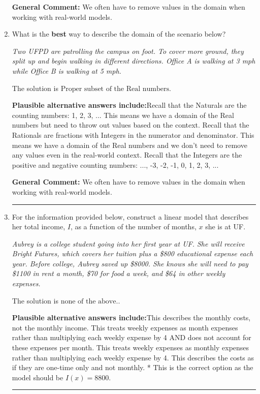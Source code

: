 \documentclass{extbook}[14pt]
\newcommand{\litem}[1]{\item #1

\rule{\textwidth}{0.4pt}}
\begin{document}
\begin{enumerate}
{\textbf{General Comment:} We often have to remove values in the domain when working with real-world models.
}
\litem{
What is the \textbf{best} way to describe the domain of the scenario below?

\begin{center}
    \textit{ Two UFPD are patrolling the campus on foot. To cover more ground, they split up and begin walking in different directions. Office A is walking at 3 mph while Office B is walking at 5 mph. }
\end{center}
The solution is \( \text{Proper subset of the Real numbers} \).\begin{enumerate}[label=\Alph*.]
\textbf{Plausible alternative answers include:}Recall that the Naturals are the counting numbers: 1, 2, 3, ...
This means we have a domain of the Real numbers but need to throw out values based on the context.
Recall that the Rationals are fractions with Integers in the numerator and denominator.
This means we have a domain of the Real numbers and we don't need to remove any values even in the real-world context.
Recall that the Integers are the positive and negative counting numbers: ..., -3, -2, -1, 0, 1, 2, 3, ... 
\end{enumerate}

\textbf{General Comment:} We often have to remove values in the domain when working with real-world models.
}
\litem{
For the information provided below, construct a linear model that describes her total income, $I$, as a function of the number of months, $x$ she is at UF.

\begin{center}
    \textit{ Aubrey is a college student going into her first year at UF. She will receive Bright Futures, which covers her tuition plus a \$800 educational expense each year. Before college, Aubrey saved up \$8000. She knows she will need to pay \$1100 in rent a month, \$70 for food a week, and \$64 in other weekly expenses. }
\end{center}
The solution is \( \text{none of the above.} \).\begin{enumerate}[label=\Alph*.]
\textbf{Plausible alternative answers include:}This describes the monthly costs, not the monthly income.
This treats weekly expenses as month expenses rather than multiplying each weekly expense by 4 AND does not account for these expenses per month.
This treats weekly expenses as monthly expenses rather than multiplying each weekly expense by 4.
This describes the costs as if they are one-time only and not monthly.
* This is the correct option as the model should be $I(x) = 8800$.
\end{enumerate}

}
\end{enumerate}
\end{document}
